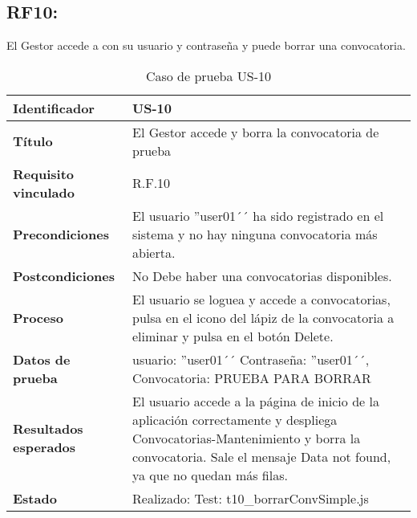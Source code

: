 \subsection{RF10:} El Gestor accede a con su usuario y contraseña y puede borrar una convocatoria.
\begin{table}[H]
	\centering
	\renewcommand{\arraystretch}{1.3} 
	\begin{tabularx}{\textwidth}{|l|X|}
		\hline
		\textbf{Identificador} & US-10 \\
		\hline
		\textbf{Título} & El Gestor accede y borra la convocatoria de prueba \\
		\hline
		\textbf{Requisito vinculado} & R.F.10 \\
		\hline
		\textbf{Precondiciones} & El usuario ''user01´´ ha sido registrado en el sistema y no hay ninguna convocatoria más abierta.\\
		\hline
		\textbf{Postcondiciones} & No Debe haber una convocatorias disponibles. \\
		\hline
		\textbf{Proceso} & El usuario se loguea y accede a convocatorias, pulsa en el icono del lápiz de la convocatoria a eliminar y pulsa en el botón Delete.\\
		\hline
		\textbf{Datos de prueba} & usuario: ''user01´´ Contraseña: ''user01´´, Convocatoria: PRUEBA PARA BORRAR \\
		\hline
		\textbf{Resultados esperados} & El usuario accede a la página de inicio de la aplicación correctamente y despliega Convocatorias-Mantenimiento y borra la convocatoria. Sale el mensaje Data not found, ya que no quedan más filas. \\
		\hline
		\textbf{Estado} & Realizado: Test: t10\_borrarConvSimple.js\\
		\hline
	\end{tabularx}
	\caption{Caso de prueba US-10}
	\label{tab:caso_us10}
\end{table}

